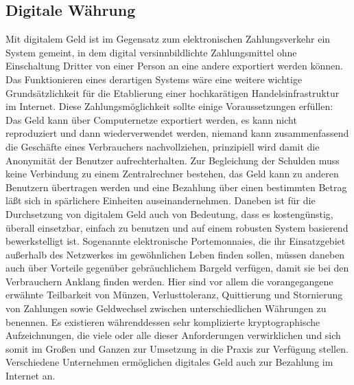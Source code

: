 \subsection{Digitale Währung}
Mit digitalem Geld ist im Gegensatz zum elektronischen Zahlungsverkehr ein System gemeint, in dem digital versinnbildlichte Zahlungsmittel ohne Einschaltung Dritter von einer Person an eine andere exportiert werden können. Das Funktionieren eines derartigen Systems wäre eine weitere wichtige Grundsätzlichkeit für die Etablierung einer hochkarätigen Handelsinfrastruktur im Internet. Diese Zahlungsmöglichkeit sollte einige Voraussetzungen erfüllen: Das Geld kann über Computernetze exportiert werden, es kann nicht reproduziert und dann wiederverwendet werden, niemand kann zusammenfassend die Geschäfte eines Verbrauchers nachvollziehen, prinzipiell wird damit die Anonymität der Benutzer aufrechterhalten. Zur Begleichung der Schulden muss keine Verbindung zu einem Zentralrechner bestehen, das Geld kann zu anderen Benutzern übertragen werden und eine Bezahlung über einen bestimmten Betrag läßt sich in spärlichere Einheiten auseinandernehmen. Daneben ist für die Durchsetzung von digitalem Geld auch von Bedeutung, dass es kostengünstig, überall einsetzbar, einfach zu benutzen und auf einem robusten System basierend bewerkstelligt ist. Sogenannte elektronische Portemonnaies, die ihr Einsatzgebiet außerhalb des Netzwerkes im gewöhnlichen Leben finden sollen, müssen daneben auch über Vorteile gegenüber gebräuchlichem Bargeld verfügen, damit sie bei den Verbrauchern Anklang finden werden. Hier sind vor allem die vorangegangene erwähnte Teilbarkeit von Münzen, Verlusttoleranz, Quittierung und Stornierung von Zahlungen sowie Geldwechsel zwischen unterschiedlichen Währungen zu benennen. Es existieren währenddessen sehr komplizierte kryptographische Aufzeichnungen, die viele oder alle dieser Anforderungen verwirklichen und sich somit im Großen und Ganzen zur Umsetzung in die Praxis zur Verfügung stellen. Verschiedene Unternehmen ermöglichen digitales Geld auch zur Bezahlung im Internet an.



